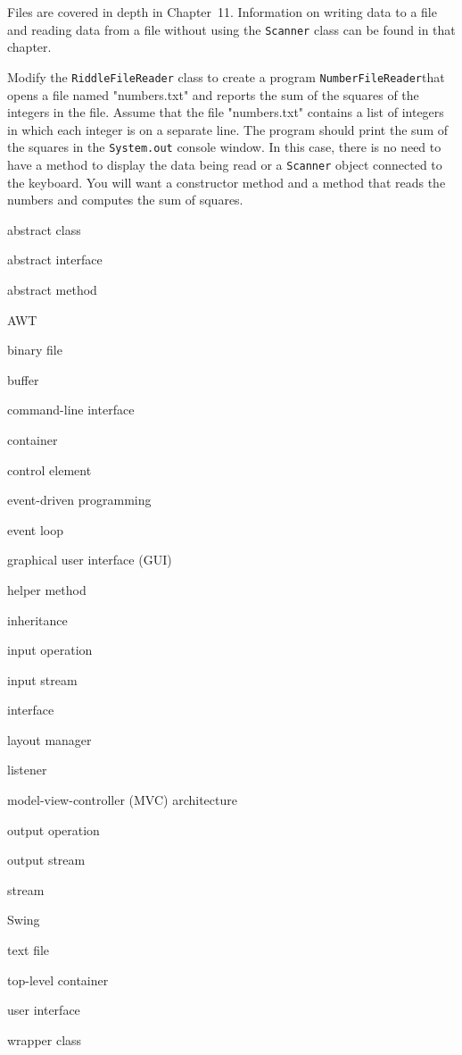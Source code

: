 Files are covered in depth in Chapter~11. Information on writing data to a file 
and reading data from a file without using the {\tt Scanner} class can be found in
that chapter.


\label{self-study-exercises}
\begin{SSTUDY}

\item Modify the {\tt RiddleFileReader} class to create a program 
{\tt NumberFileReader}that opens
a file named "numbers.txt" and reports the sum of the squares of the integers 
in the file.  Assume that the file "numbers.txt" contains a list of integers 
in which each integer is on a separate line. The program should print the
sum of the squares in the {\tt System.out} console window. In this case, 
there is no need to have a method to display the data being read or
a {\tt Scanner} object connected to the keyboard.  You will want a constructor
method and a method that reads the numbers and computes the sum of squares.

\end{SSTUDY}

\label{chapter-summary}
\label{technical-terms}
\begin{KT}

abstract class

abstract interface

abstract method

AWT

binary file

buffer

command-line interface

container

control element

event-driven programming

event loop 

graphical user interface (GUI)

helper method

inheritance

input operation

input stream

interface

layout manager

listener

model-view-controller (MVC) architecture

output operation

output stream

stream

Swing

text file

top-level container

user interface

wrapper class
\end{KT}

